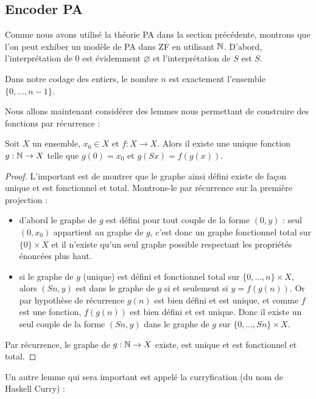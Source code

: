 \subsection{Encoder PA}

Comme nous avons utilisé la théorie PA dans la section précédente, montrons que l'on peut exhiber un modèle de PA dans ZF en utilisant $\mathbb{N}$. D'abord, l'interprétation de $0$ est évidemment $\varnothing$ et l'interprétation de $S$ est $S$.

\begin{rmk}
    Dans notre codage des entiers, le nombre $n$ est exactement l'ensemble $\{0,\ldots,n-1\}$.
\end{rmk}

Nous allons maintenant considérer des lemmes nous permettant de construire des fonctions par récurrence :

\begin{lem}
    Soit $X$ un ensemble, $x_0\in X$ et $f : X \to X$. Alors il existe une unique fonction $g : \mathbb{N}\to X$ telle que $g(0) = x_0$ et $g(Sx) = f(g(x))$.
\end{lem}

\begin{proof}
    L'important est de montrer que le graphe ainsi défini existe de façon unique et est fonctionnel et total. Montrons-le par récurrence sur la première projection :
    \begin{itemize}[label=$\bullet$]
        \item d'abord le graphe de $g$ est défini pour tout couple de la forme $(0,y)$ : seul $(0,x_0)$ appartient au graphe de $g$, c'est donc un graphe fonctionnel total sur $\{0\}\times X$ et il n'existe qu'un seul graphe possible respectant les propriétés énoncées plus haut.
        \item si le graphe de $g$ (unique) est défini et fonctionnel total sur $\{0,\ldots,n\}\times X$, alors $(Sn,y)$ est dans le graphe de $g$ si et seulement si $y=f(g(n))$. Or par hypothèse de récurrence $g(n)$ est bien défini et est unique, et comme $f$ est une fonction, $f(g(n))$ est bien défini et est unique. Donc il existe un seul couple de la forme $(Sn,y)$ dans le graphe de $g$ sur $\{0,\ldots,Sn\}\times X$.
    \end{itemize}
    Par récurrence, le graphe de $g : \mathbb{N}\to X$ existe, est unique et est fonctionnel et total.
\end{proof}

Un autre lemme qui sera important est appelé la curryfication (du nom de Haskell Curry) :

